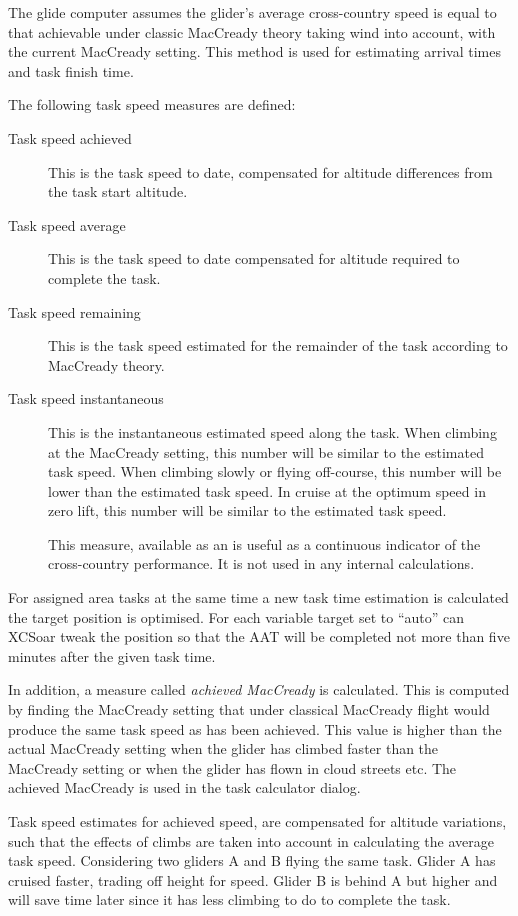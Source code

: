 The glide computer assumes the glider's average cross-country speed is
equal to that achievable under classic MacCready theory taking wind
into account, with the current MacCready setting.  This method is used
for estimating arrival times and task finish time.

The following task speed measures are defined:
\begin{description}
\item[Task speed achieved]  This is the task speed to date, compensated
for altitude differences from the task start altitude.
\item[Task speed average]  This is the task speed to date compensated
for altitude required to complete the task.
\item[Task speed remaining]  This is the task speed estimated for the
  remainder of the task according to MacCready theory.
\item[Task speed instantaneous]  This is the instantaneous estimated speed 
along the task.  When climbing at the MacCready setting, this number
will be similar to the estimated task speed.  When climbing slowly or
flying off-course, this number will be lower than the estimated task
speed.  In cruise at the optimum speed in zero lift, this number will
be similar to the estimated task speed.

This measure, available as an {\InfoBox} is useful as a continuous
indicator of the cross-country performance.  It is not used in any
internal calculations.
\end{description}

For assigned area tasks at the same time a new task time estimation is
calculated the target position is optimised. \tip For each variable target set
to ``auto'' can XCSoar tweak the position so that the AAT will be completed not
more than five minutes after the given task time.

In addition, a measure called {\em achieved MacCready} is calculated.
This is computed by finding the MacCready setting that under classical
MacCready flight would produce the same task speed as has been
achieved.  This value is higher than the actual MacCready setting when
the glider has climbed faster than the MacCready setting or when the
glider has flown in cloud streets etc.  The achieved MacCready is used
in the task calculator dialog.

Task speed estimates for achieved speed, are compensated for altitude
variations, such that the effects of climbs are taken into account in
calculating the average task speed.  Considering two gliders A and B
flying the same task.  Glider A has cruised faster, trading off height
for speed.  Glider B is behind A but higher and will save time later
since it has less climbing to do to complete the task.

